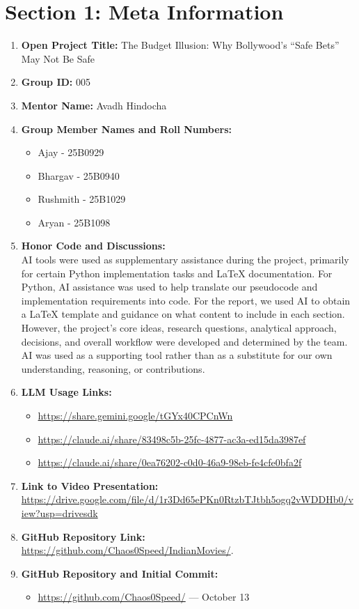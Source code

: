\documentclass[a4paper, 11pt]{article}
\begin{document}
\section*{Section 1: Meta Information}

\begin{enumerate}
    \item \textbf{Open Project Title:} The Budget Illusion: Why Bollywood’s “Safe
Bets” May Not Be Safe
    \item \textbf{Group ID:} 005
    \item \textbf{Mentor Name:} Avadh Hindocha
    \item \textbf{Group Member Names and Roll Numbers:}
    \begin{itemize}
        \item Ajay - 25B0929
        \item Bhargav - 25B0940
        \item Rushmith - 25B1029
        \item Aryan - 25B1098
    \end{itemize}
    \item \textbf{Honor Code and Discussions:}  \\
AI tools were used as supplementary assistance during the project, primarily for certain Python implementation tasks and LaTeX documentation. For Python, AI assistance was used to help translate our pseudocode and implementation requirements into code. For the report, we used AI to obtain a LaTeX template and guidance on what content to include in each section. However, the project's core ideas, research questions, analytical approach, decisions, and overall workflow were developed and determined by the team. AI was used as a supporting tool rather than as a substitute for our own understanding, reasoning, or contributions.
  \item \textbf{LLM Usage Links:}
\begin{itemize}
    \item \url{https://share.gemini.google/tGYx40CPCnWn}
    \item \url{https://claude.ai/share/83498c5b-25fc-4877-ac3a-ed15da3987ef}
    \item \url{https://claude.ai/share/0ea76202-c0d0-46a9-98eb-fe4cfe0bfa2f}
\end{itemize}

    \item \textbf{Link to Video Presentation:} \url{https://drive.google.com/file/d/1r3Dd65ePKn0RtzbTJtbh5ogq2vWDDHb0/view?usp=drivesdk}
    \item \textbf{GitHub Repository Link:} \url{https://github.com/Chaos0Speed/IndianMovies/}.
\item \textbf{GitHub Repository and Initial Commit:}
\begin{itemize}
    \item \url{https://github.com/Chaos0Speed/} --- October 13
\end{itemize}


\end{enumerate}
\end{document}
